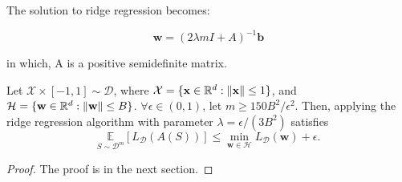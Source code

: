 The solution to ridge regression becomes:

\begin{equation}
	\mathbf{w} = {(2\lambda m I + A)}^{-1} \mathbf{b}
\end{equation}

in which, A is a positive semidefinite matrix.

\begin{thm}
	Let $ \mathcal{X}\times [-1,1] \sim \mathcal{D} $, 
	where $ \mathcal{X} = \{ \mathbf{x} \in \mathbb{R}^d : \Arrowvert \mathbf{x} \Arrowvert \le 1 \} $, 
	and $ \mathcal{H} = \{ \mathbf{w} \in \mathbb{R}^d : \Arrowvert \mathbf{w} \Arrowvert \le B \} $.
	$ \forall \epsilon \in (0,1) $, let $ m \ge 150B^2/\epsilon^2 $. Then, applying the ridge regression algorithm
	with parameter $ \lambda = \epsilon/(3B^2) $ satisfies
	\[ \underset{S\sim\mathcal{D}^m} {\mathbb{E}} [L_\mathcal{D}(A(S))] 
	\le \min\limits_{\mathbf{w}\in\mathcal{H}}L_\mathcal{D}(\mathbf{w}) + \epsilon.\]
	\begin{proof}
		The proof is in the next section.
	\end{proof}
\end{thm}

